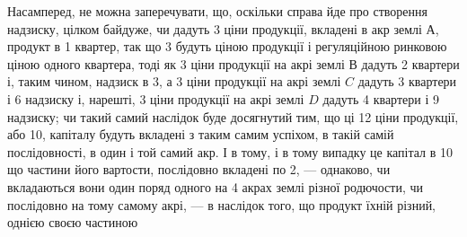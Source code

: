 Насамперед, не можна заперечувати, що, оскільки справа йде про створення
надзиску, цілком байдуже, чи дадуть 3 ціни продукції, вкладені в акр
землі $А$, продукт в 1 квартер, так що 3 будуть ціною продукції і регуляційною
ринковою ціною одного квартера, тоді як 3 ціни продукції на акрі землі
$В$ дадуть 2 квартери і, таким чином, надзиск в 3, а 3 ціни продукції
на акрі землі $C$ дадуть 3 квартери і 6 надзиску і, нарешті, 3 ціни
продукції на акрі землі $D$ дадуть 4 квартери і 9 надзиску; чи такий самий
наслідок буде досягнутий тим, що ці 12 ціни продукції, або 10,
капіталу будуть вкладені з таким самим успіхом, в такій самій послідовності,
в один і той самий акр. І в тому, і в тому випадку це капітал в 10
що частини його вартости, послідовно вкладені по 2, — однаково, чи вкладаються
вони один поряд одного на 4 акрах землі різної родючости, чи послідовно на
тому самому акрі, — в наслідок того, що продукт їхній різний, однією своєю частиною
\parbreak{}  %
